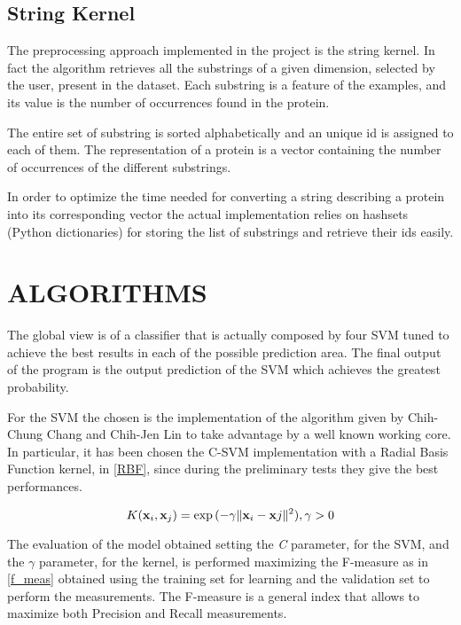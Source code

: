 \documentclass{acm_proc_article-sp-sigmod07}
\begin{document}
\subsection{String Kernel}
The preprocessing approach implemented in the project is the string
kernel. In fact the algorithm retrieves all the substrings of a given
dimension, selected by the user, present in the dataset.
Each substring is a feature of the examples, and its value is the number
of occurrences found in the protein. 

The entire set of substring is sorted alphabetically and an unique id is
assigned to each of them. 
The representation of a protein is a vector containing the number of
occurrences of the different substrings.

In order to optimize the time needed for converting a string describing a
protein into its corresponding vector the actual implementation relies on
hashsets (Python dictionaries) for storing the list of substrings and
retrieve their ids easily.

\section{ALGORITHMS}
The global view is of a classifier that is actually composed by four SVM tuned to
achieve the best results in each of the possible prediction area. The final output
of the program is the output prediction of the SVM which achieves the greatest 
probability.

For the SVM the chosen is the implementation of the algorithm given by 
Chih-Chung Chang and Chih-Jen Lin \cite{libSVM} to take advantage by a well 
known working core. 
In particular, it has been chosen the C-SVM implementation with a Radial Basis 
Function kernel, in \ref{RBF}, since during the preliminary tests they give the best 
performances. 

\begin{equation}
 K(\bold{x}_i , \bold{x}_j ) = \exp{(-\gamma\|\bold{x}_i - \bold{x}j\|^2 )}, \gamma > 0
\label{RBF}
\end{equation}

The evaluation of the model obtained setting the \emph{C} parameter, for
the SVM, and the $ \gamma $ parameter, for the kernel, is performed maximizing 
the F-measure as in \ref{f_meas} obtained using the training set for learning and
the validation set to perform the measurements. The F-measure is a general index
that allows to maximize both Precision and Recall measurements.
\end{document}

